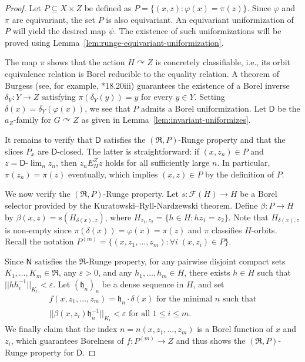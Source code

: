 \documentclass[12pt]{paper}
\numberwithin{equation}{section}
\theoremstyle{plain}
\theoremstyle{definition}
\newcommand{\mfR}{\mathfrak{R}}
\newcommand{\effros}[1]{\mathcal{F}(#1)}
\newcommand{\unifm}{\mathsf{D}}
\newcommand{\unifn}{\mathsf{N}}
\newcommand{\acts}{\curvearrowright}
\newcommand{\norm}[1]{||#1||}
\renewcommand{\epsilon}{\varepsilon}
\renewcommand{\phi}{\varphi}
\begin{document}
\begin{proof}
  Let \(P \subseteq X \times Z\) be defined as \(P = \{(x,z) : \phi(x) = \pi(z)\}\). Since \(\phi\)
  and \(\pi\) are equivariant, the set \(P\) is also equivariant. An equivariant uniformization of
  \(P\) will yield the desired map \(\psi\). The existence of such uniformizations will be proved
  using Lemma~\ref{lem:runge-equivariant-uniformization}.

  The map \(\pi\) shows that the action \(H \acts Z\) is concretely classifiable, i.e., its orbit
  equivalence relation is Borel reducible to the equality relation. A theorem of Burgess (see, for
  example, \cite{Kechris}*{18.20iii}) guarantees the existence of a Borel inverse
  \(\delta_{Y} : Y \to Z\) satisfying \(\pi(\delta_{Y}(y)) = y\) for every \(y \in Y\).  Setting
  \(\delta(x) =\delta_{Y}(\phi(x))\), we see that \(P\) admits a Borel uniformization.  Let
  \(\unifm\) be the \(a_{Z}\)-family for \(G \acts Z\) as given in
  Lemma~\ref{lem:invariant-uniformizes}.

  It remains to verify that \(\unifm\) satisfies the \((\mfR, P)\)-Runge property and that the
  slices \(P_{x}\) are \(\unifm\)-closed. The latter is straightforward: if \((x, z_{n}) \in P\) and
  \(z = \unifm\text{-}\lim_{n} z_{n}\), then \(z_{n} E_{H}^{Z} z\) holds for all sufficiently large
  \(n\). In particular, \(\pi(z_{n}) = \pi(z)\) eventually, which implies \((x, z) \in P\) by the
  definition of \(P\).

  We now verify the \((\mfR,P)\)-Runge property. Let \(s : \effros{H} \to H\) be a Borel selector
  provided by the Kuratowski--Ryll-Nardzewski theorem. Define \(\beta : P \to H\) by
  \(\beta(x,z) = s(H_{\delta(x), z})\), where \(H_{z_{1}, z_{2}} = \{h \in H : hz_{1} = z_{2}\}\).
  Note that \(H_{\delta(x),z}\) is non-empty since \(\pi(\delta(x)) = \phi(x) = \pi(z)\) and \(\pi\)
  classifies \(H\)-orbits. Recall the notation
  \(P^{(m)}=\{(x,z_1,\ldots,z_m): \forall i\; (x,z_i)\in P\}\).

  Since \(\unifn\) satisfies the \(\mfR\)-Runge property, for any pairwise disjoint compact sets
  \(K_{1}, \ldots, K_{m} \in \mfR\), any \(\epsilon > 0\), and any \(h_{1}, \ldots, h_{m} \in H\),
  there exists \(h \in H\) such that \(\norm{h h^{-1}_{i}}_{K_{i}} < \epsilon\).  Let
  \(({\mathfrak h}_{n})_{n}\) be a dense sequence in \(H\), and set
  \begin{multline*}
    f(x, z_{1}, \ldots, z_{m}) = {\mathfrak h}_{n}\cdot \delta(x) \textrm{ for the minimal \(n\) such that} \\
    \norm{\beta(x,z_{i}){\mathfrak h}_{n}^{-1}}_{K_{i}} < \epsilon
    \textrm{ for all \(1 \le i \le m\)}.
  \end{multline*}
  We finally claim that the index \(n=n(x,z_1,\ldots,z_m)\) is a Borel function of \(x\) and
  \(z_{i}\), which guarantees Borelness of \(f:P^{(m)}\to Z\) and thus shows the \((\mfR, P)\)-Runge
  property for \(\unifm\).


\end{proof}
\end{document}
